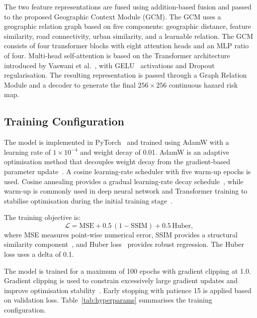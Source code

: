 \documentclass[sigconf, review=true]{acmart}
\begin{document}
The two feature representations are fused using addition-based fusion and passed to the proposed Geographic Context Module (GCM). The GCM uses a geographic relation graph based on five components: geographic distance, feature similarity, road connectivity, urban similarity, and a learnable relation. The GCM consists of four transformer blocks with eight attention heads and an MLP ratio of four. Multi-head self-attention is based on the Transformer architecture introduced by Vaswani et al.~\cite{vaswani2017attention}, with GELU~\cite{hendrycks2016gelu} activations and Dropout~\cite{srivastava2014dropout} regularisation. The resulting representation is passed through a Graph Relation Module and a decoder to generate the final $256\times256$ continuous hazard risk map.

\subsection{Training Configuration}

The model is implemented in PyTorch~\cite{paszke2019pytorch} and trained using AdamW with a learning rate of $1\times10^{-4}$ and weight decay of 0.01. AdamW is an adaptive optimisation method that decouples weight decay from the gradient-based parameter update~\cite{loshchilov2019adamw}. A cosine learning-rate scheduler with five warm-up epochs is used. Cosine annealing provides a gradual learning-rate decay schedule~\cite{loshchilov2017sgdr}, while warm-up is commonly used in deep neural network and Transformer training to stabilise optimisation during the initial training stage~\cite{kingma2015adam}.

The training objective is:
\begin{equation}
  \mathcal{L} = \mathrm{MSE} + 0.5\,(1 - \mathrm{SSIM}) + 0.5\,\mathrm{Huber},
  \label{eq:loss}
\end{equation}
where MSE measures point-wise numerical error, SSIM provides a structural similarity component~\cite{wang2004ssim}, and Huber loss~\cite{huber1964robust} provides robust regression. The Huber loss uses a delta of 0.1.

The model is trained for a maximum of 100 epochs with gradient clipping at 1.0. Gradient clipping is used to constrain excessively large gradient updates and improve optimisation stability~\cite{pascanu2013difficulty}. Early stopping with patience 15 is applied based on validation loss. Table~\ref{tab:hyperparams} summarises the training configuration.
\end{document}
